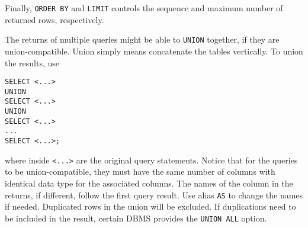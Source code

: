 Finally, \verb|ORDER BY| and \verb|LIMIT| controls the sequence and maximum number of returned rows, respectively.

The returns of multiple queries might be able to \verb|UNION| together, if they are union-compatible. Union simply means concatenate the tables vertically. To union the results, use
\begin{lstlisting}
SELECT <...>
UNION
SELECT <...>
UNION
SELECT <...>
...
SELECT <...>;
\end{lstlisting}
where inside \verb|<...>| are the original query statements. Notice that for the queries to be union-compatible, they must have the same number of columns with identical data type for the associated columns. The names of the column in the returns, if different, follow the first query result. Use alias \verb|AS| to change the names if needed. Duplicated rows in the union will be excluded. If duplications need to be included in the result, certain DBMS provides the \verb|UNION ALL| option.

